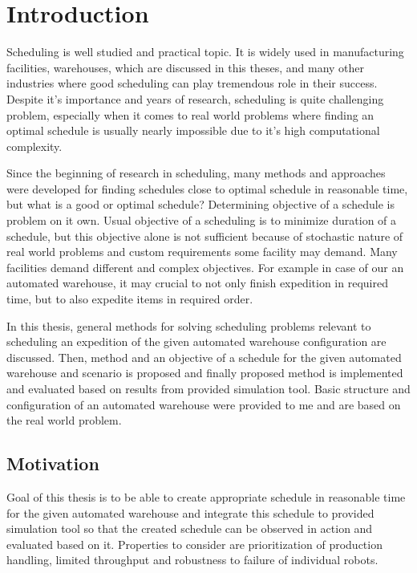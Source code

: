 \documentclass{ctuthesis}
\begin{document}
\maketitle

\chapter{Introduction}

Scheduling is well studied and practical topic. It is widely used in manufacturing facilities, warehouses, which are discussed in this theses, and many other industries where good scheduling can play tremendous role in their success. Despite it's importance and years of research, scheduling is quite challenging problem, especially when it comes to real world problems where finding an optimal schedule is usually nearly impossible due to it's high computational complexity. 

Since the beginning of research in scheduling, many methods and approaches were developed for finding schedules close to optimal schedule in reasonable time, but what is a good or optimal schedule? Determining objective of a schedule is problem on it own. Usual objective of a scheduling is to minimize duration of a schedule, but this objective alone is not sufficient because of stochastic nature of real world problems and custom requirements some facility may demand. Many facilities demand different and complex objectives. For example in case of our an automated warehouse, it may crucial to not only finish expedition in required time, but to also expedite items in required order. 

In this thesis, general methods for solving scheduling problems relevant to scheduling an expedition of the given automated warehouse configuration are discussed. Then, method and an objective of a schedule for the given automated warehouse and scenario is proposed and finally proposed method is implemented and evaluated based on results from provided simulation tool. Basic structure and configuration of an automated warehouse were provided to me and are based on the real world problem.

\section{Motivation}

Goal of this thesis is to be able to create appropriate schedule in reasonable time for the given automated warehouse and integrate this schedule to provided simulation tool so that the created schedule can be observed in action and evaluated based on it. Properties to consider are prioritization of production handling, limited throughput and robustness to failure of individual robots.
\end{document}
